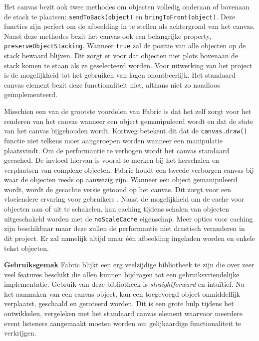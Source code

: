 Het canvas bezit ook twee methodes om objecten volledig onderaan of bovenaan de stack te plaatsen: \texttt{sendToBack(object)} en \texttt{bringToFront(object)}. Deze functies zijn perfect om de afbeelding in te stellen als achtergrond van het canvas. Naast deze methodes bezit het canvas ook een belangrijke property, \texttt{preserveObjectStacking}. Wanneer \texttt{true} zal de positie van alle objecten op de stack bewaard blijven. Dit zorgt er voor dat objecten niet plots bovenaan de stack komen te staan als ze geselecteerd worden. Voor uitwerking van het project is de mogelijkheid tot het gebruiken van lagen onontbeerlijk. Het standaard canvas element bezit deze functionaliteit niet, althans niet zo naadloos ge\"{i}mplementeerd. 

Misschien een van de grootste voordelen van Fabric is dat het zelf zorgt voor het renderen van het canvas wanneer een object gemanipuleerd wordt en dat de state van het canvas bijgehouden wordt. Kortweg betekent dit dat de \texttt{canvas.draw()} functie niet telkens moet aangeroepen worden wanneer een manipulatie plaatsvindt. Om de performantie te verhogen wordt het canvas standaard gecached. De invloed hiervan is vooral te merken bij het herschalen en verplaatsen van complexe objecten. %
Fabric houdt een tweede verborgen canvas bij waar de objecten reeds op aanwezig zijn. Wanneer een object gemanipuleerd wordt, wordt de gecachte versie getoond op het canvas. Dit zorgt voor een vloeiendere ervaring voor gebruikers \cite{FabricJSCaching}. Naast de mogelijkheid om de cache voor objecten aan of uit te schakelen, kan caching tijdens schalen van objecten uitgeschakeld worden met de \texttt{noScaleCache} eigenschap. Meer opties voor caching zijn beschikbaar maar deze zullen de performantie niet drastisch veranderen in dit project. Er zal namelijk altijd maar \'{e}\'{e}n afbeelding ingeladen worden en enkele tekst objecten. %

\newpage
\textbf{Gebruiksgemak} \break
Fabric blijkt een erg veelzijdige bibliotheek te zijn die over zeer veel features beschikt die allen kunnen bijdragen tot een gebruiksvriendelijke implementatie. Gebruik van deze bibliotheek is \textit{straightforward} en intu\"{i}tief. Na het aanmaken van een canvas object, kan een toegevoegd object onmiddellijk verplaatst, geschaald en geroteerd worden. Dit is een grote hulp tijdens het ontwikkelen, vergeleken met het standaard canvas element waarvoor meerdere event listeners aangemaakt moeten worden om gelijkaardige functionaliteit te verkrijgen. 

